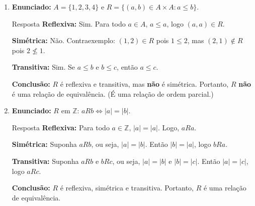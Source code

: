 \documentclass[12pt]{article}
\begin{document}
\begin{enumerate}
\begin{block}{Resposta}
\textbf{Transitiva:} Suponha $aRb$ e $bRc$. Então $a - b = 4k$ e $b - c = 4m$ para $k, m \in \mathbb{Z}$. Somando:
\[
a - c = (a - b) + (b - c) = 4k + 4m = 4(k + m),
\]
que é múltiplo de 4. Logo, $aRc$.

\textbf{Conclusão:} $R$ é uma relação de equivalência.
\end{block}

\vspace{0.8cm}

\item \textbf{Enunciado:} $A = \{1,2,3,4\}$ e $R = \{(a,b) \in A \times A : a \leq b\}$.

\begin{block}{Resposta}
\textbf{Reflexiva:} Sim. Para todo $a \in A$, $a \leq a$, logo $(a,a) \in R$.

\textbf{Simétrica:} Não. Contraexemplo: $(1,2) \in R$ pois $1 \leq 2$, mas $(2,1) \notin R$ pois $2 \not\leq 1$.

\textbf{Transitiva:} Sim. Se $a \leq b$ e $b \leq c$, então $a \leq c$.

\textbf{Conclusão:} $R$ é reflexiva e transitiva, mas \textbf{não} é simétrica. Portanto, $R$ \textbf{não} é uma relação de equivalência. (É uma relação de ordem parcial.)
\end{block}

\vspace{0.8cm}

\item \textbf{Enunciado:} $R$ em $\mathbb{Z}$: $aRb \Leftrightarrow |a| = |b|$.

\begin{block}{Resposta}
\textbf{Reflexiva:} Para todo $a \in \mathbb{Z}$, $|a| = |a|$. Logo, $aRa$.

\textbf{Simétrica:} Suponha $aRb$, ou seja, $|a| = |b|$. Então $|b| = |a|$, logo $bRa$.

\textbf{Transitiva:} Suponha $aRb$ e $bRc$, ou seja, $|a| = |b|$ e $|b| = |c|$. Então $|a| = |c|$, logo $aRc$.

\textbf{Conclusão:} $R$ é reflexiva, simétrica e transitiva. Portanto, $R$ é uma relação de equivalência.
\end{block}

\vspace{0.8cm}


\end{enumerate}
\end{document}
